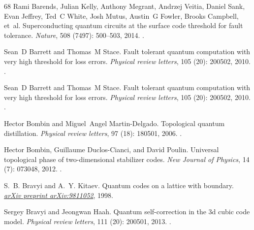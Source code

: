 \documentclass[a4paper, 10pt, accepted=2021-11-03]{quantumarticle}
\begin{document}
{\begin{thebibliography}{68}
Rami Barends, Julian Kelly, Anthony Megrant, Andrzej Veitia, Daniel Sank, Evan
  Jeffrey, Ted~C White, Josh Mutus, Austin~G Fowler, Brooks Campbell, et~al.
\newblock Superconducting quantum circuits at the surface code threshold for
  fault tolerance.
\newblock \emph{Nature}, 508 (7497): 500--503, 2014.
\newblock {}.

Sean~D Barrett and Thomas~M Stace.
\newblock Fault tolerant quantum computation with very high threshold for loss
  errors.
\newblock \emph{Physical review letters}, 105 (20): 200502,
  2010{}.
\newblock {}.

Sean~D Barrett and Thomas~M Stace.
\newblock Fault tolerant quantum computation with very high threshold for loss
  errors.
\newblock \emph{Physical review letters}, 105 (20): 200502,
  2010{}.
\newblock {}.

Hector Bombin and Miguel~Angel Martin-Delgado.
\newblock Topological quantum distillation.
\newblock \emph{Physical review letters}, 97 (18): 180501,
  2006.
\newblock {}.

Hector Bombin, Guillaume Duclos-Cianci, and David Poulin.
\newblock Universal topological phase of two-dimensional stabilizer codes.
\newblock \emph{New Journal of Physics}, 14 (7): 073048,
  2012.
\newblock {}.

S.~B. Bravyi and A.~Y. Kitaev.
\newblock Quantum codes on a lattice with boundary.
\newblock \emph{\href{https://arxiv.org/abs/quant-ph/9811052}{arXiv preprint
  arXiv:9811052}}, 1998.

Sergey Bravyi and Jeongwan Haah.
\newblock Quantum self-correction in the 3d cubic code model.
\newblock \emph{Physical review letters}, 111 (20): 200501,
  2013.
\newblock {}.


\end{thebibliography}}
\end{document}
